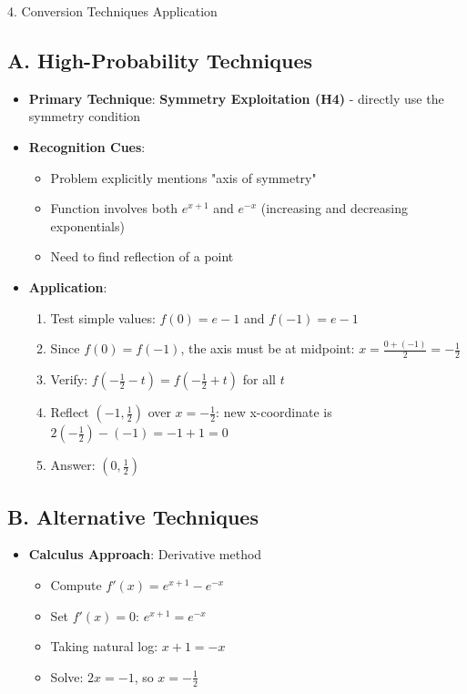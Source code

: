 \documentclass[12pt]{article}
\begin{document}
\begin{conversionbox}{4. Conversion Techniques Application}

\subsection*{A. High-Probability Techniques}
\begin{itemize}[leftmargin=*]
    \item \textbf{Primary Technique}: \textbf{Symmetry Exploitation (H4)} - directly use the symmetry condition
    
    \item \textbf{Recognition Cues}:
    \begin{itemize}
        \item Problem explicitly mentions "axis of symmetry"
        \item Function involves both $e^{x+1}$ and $e^{-x}$ (increasing and decreasing exponentials)
        \item Need to find reflection of a point
    \end{itemize}
    
    \item \textbf{Application}:
    \begin{enumerate}
        \item Test simple values: $f(0) = e - 1$ and $f(-1) = e - 1$
        \item Since $f(0) = f(-1)$, the axis must be at midpoint: $x = \frac{0 + (-1)}{2} = -\frac{1}{2}$
        \item Verify: $f(-\frac{1}{2} - t) = f(-\frac{1}{2} + t)$ for all $t$
        \item Reflect $(-1, \frac{1}{2})$ over $x = -\frac{1}{2}$: new x-coordinate is $2(-\frac{1}{2}) - (-1) = -1 + 1 = 0$
        \item Answer: $(0, \frac{1}{2})$
    \end{enumerate}
\end{itemize}

\subsection*{B. Alternative Techniques}
\begin{itemize}[leftmargin=*]
    \item \textbf{Calculus Approach}: Derivative method
    \begin{itemize}
        \item Compute $f'(x) = e^{x+1} - e^{-x}$
        \item Set $f'(x) = 0$: $e^{x+1} = e^{-x}$
        \item Taking natural log: $x + 1 = -x$
        \item Solve: $2x = -1$, so $x = -\frac{1}{2}$
    \end{itemize}
    

\end{itemize}
\end{conversionbox}
\end{document}
